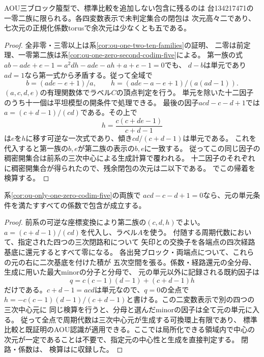 \begin{corollary}[AOUに残る一零係数の余次元五境界]
\label{cor:ou-only-one-zero-codim-five}
AOU三ブロック箙型で、標準比較を追加しない包含に残るのは
台134217471の一零二族に限られる。各四変数表示で未判定集合の閉包は
次元高々二であり、七次元の正規化係数torusで余次元は少なくとも五である。
\end{corollary}
\begin{proof}
全非零・三零以上は系\ref{cor:ou-one-two-ten-families}の証明、
二零は前定理、一零第二族は系\ref{cor:ou-one-zero-second-codim-five}による。
第一族の式$ab-ade+e-1=a^2dh-ade-ah+a+e-1=0$でも、
$d-b$は単元であり$ad=1$なら第一式から矛盾する。従って全域で
\[
 b=(ade-e+1)/a,\qquad h=(ade-a-e+1)/(a(ad-1)).
\]
$(a,c,d,e)$の有理関数体でラベル$C$の頂点判定を行う。
単元を除いた十二因子のうち十一個は平坦模型の開条件で処理できる。
最後の因子$acd-c-d+1$では$a=(c+d-1)/(cd)$である。その上で
\[
 h=\frac{c(c+de-1)}{c+d-1}
\]
は$e$を$h$に移す可逆な一次式であり、傾き$cd/(c+d-1)$は単元である。
これを代入すると第一族の$b,e$が第二族の表示の$b,e$に一致する。
従ってこの同じ因子の稠密開集合は前系の三次中心による生成計算で覆われる。
十二因子のそれぞれに稠密開集合が得られたので、残余閉包の次元は二以下である。
でこの帰着を検算する。
\end{proof}

\begin{proposition}[一零二族の共通中心因子の全特殊化]
\label{prop:ou-one-zero-central-divisor}
系\ref{cor:ou-only-one-zero-codim-five}の両族で
$acd-c-d+1=0$なら、元の単元条件を満たすすべての係数で包含が成立する。
\end{proposition}
\begin{proof}
前系の可逆な座標変換により第二族の$(c,d,h)$でよい。
$a=(c+d-1)/(cd)$を代入し、ラベル$A$を使う。
付随する周期代数において、指定された四つの三次閉路和について
矢印との交換子を各端点の四次経路基底に還元するとすべて零になる。
各出発ブロック・両端点について、これらの元の右に二次基底を付けた積が
五次空間を張る。係数・経路還元の全分母、生成に用いた最大minorの分子と分母で、
元の単元以外に記録される既約因子は
\[
 q=c(c-1)(d-1)+(c+d-1)h
\]
だけである。$c+d-1=acd$は単元なので、$q=0$の全点で
$h=-c(c-1)(d-1)/(c+d-1)$と書ける。この二変数表示で別の四つの三次中心元に
同じ検算を行うと、分母と選んだminorの因子は全て元の単元に入る。
従って全点で周期代数は三次中心元が生成する可換環上有限であり、
標準比較と既証明のAOU認識が適用できる。ここでは局所化できる領域内で中心の
次元が一定であることは不要で、指定元の中心性と生成を直接判定する。
閉路・係数は、
検算はに収録した。
\end{proof}

